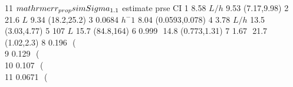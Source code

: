 \begin{Schunk}
\begin{Soutput}
11                                                                     $\\mathrm{err_{prop}\\sim \\Sigma_{1.1}}$
                   estimate prse             CI
1              8.58 $ L/h $ 9.53    (7.17,9.98)
2                21.6 $ L $ 9.34    (18.2,25.2)
3          0.0684 $ h^-1  $ 8.04 (0.0593,0.078)
4              3.78 $ L/h $ 13.5    (3.03,4.77)
5                 107 $ L $ 15.7     (84.8,164)
6                0.999 $  $ 14.8   (0.773,1.31)
7                 1.67 $  $ 21.7     (1.02,2.3)
8   0.196 $  $ (\\%CV=46.5)   23  (0.124,0.266)
9   0.129 $  $ (\\%CV=37.1) 30.4  (0.064,0.187)
10  0.107 $  $ (\\%CV=33.6) 25.3  (0.064,0.152)
11 0.0671 $  $ (\\%CV=26.3) 11.4  (0.0551,0.08)
\end{Soutput}
\end{Schunk}
